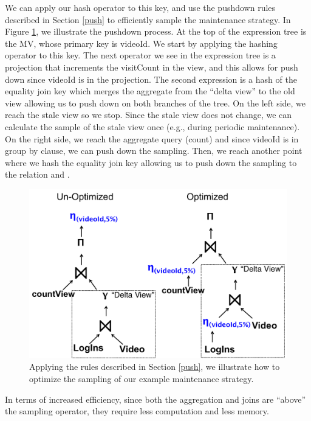 
We can apply our hash operator to this key, and use the pushdown rules described in Section \ref{push} to efficiently sample the maintenance strategy.
In Figure \ref{exexpr2}, we illustrate the pushdown process.
At the top of the expression tree is the MV, whose primary key is \textsf{videoId}. 
We start by applying the hashing operator to this key.
The next operator we see in the expression tree is a projection that increments the \textsf{visitCount} in the view, and this allows
for push down since \textsf{videoId} is in the projection.
The second expression is a hash of the equality join key which merges the aggregate from the ``delta view'' to the old view allowing us to push down on both branches of the tree.
On the left side, we reach the stale view so we stop.
Since the stale view does not change, we can calculate the sample of the stale view once (e.g., during periodic maintenance). 
On the right side, we reach the aggregate query (count) and since \textsf{videoId} is in group by clause, we can push down the sampling.
Then, we reach another point where we hash the equality join key allowing us to push down the sampling to the relation  and .

\begin{figure}[t] \vspace{-2em}
\centering
 \includegraphics[scale=0.24]{figs/example_expression_tree_2.pdf} \vspace{-.5em}
 \caption{Applying the rules described in Section \ref{push}, we illustrate how to optimize the sampling of our example maintenance strategy.  \label{exexpr2}}\vspace{-1.75em}
\end{figure}

In terms of increased efficiency, since both the aggregation and joins are ``above'' the sampling operator, they require less computation and less memory.


